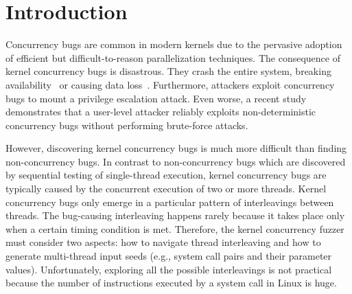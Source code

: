 \section{Introduction}
\label{s:intro}


Concurrency bugs are common in modern kernels due to 
the pervasive adoption of efficient but difficult-to-reason
parallelization techniques.
The consequence of kernel concurrency bugs is disastrous. They crash
the entire system, breaking availability~\cite{cve201812232, snowboardbug} or causing data loss~\cite{dataloss}.
Furthermore, attackers 
exploit concurrency bugs to mount a privilege escalation attack.
Even worse, a recent study~\cite{exprace} demonstrates that a user-level attacker 
reliably exploits non-deterministic concurrency bugs without performing
brute-force attacks.

However, discovering kernel concurrency bugs is much more difficult than 
finding non-concurrency bugs. 
In contrast to non-concurrency bugs which are discovered by 
sequential testing of single-thread execution,
kernel concurrency bugs are typically caused by the concurrent execution 
of two or more threads. 
Kernel concurrency bugs only emerge in a particular pattern of 
interleavings between threads. The bug-causing interleaving happens 
rarely because it takes place only when a certain timing condition is met.
Therefore, the kernel concurrency fuzzer must consider two aspects: 
how to navigate thread interleaving and how to generate multi-thread input seeds (e.g., system call pairs and their parameter values).
Unfortunately, exploring all the possible interleavings is not practical because 
the number of instructions executed by a system call in Linux is huge.


